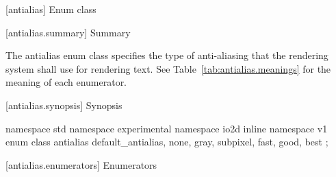  [antialias] {Enum class }

 [antialias.summary] { Summary}

\pnum
The antialias enum class specifies the type of anti-aliasing that the rendering
system shall use for rendering text. See 
Table~\ref{tab:antialias.meanings} for the meaning of each
 enumerator.

 [antialias.synopsis] { Synopsis}

\begin{codeblock}
namespace std { namespace experimental { namespace io2d { inline namespace v1 {
  enum class antialias {
    default_antialias,
    none,
    gray,
    subpixel,
    fast,
    good,
    best
  };
} } } }
\end{codeblock}

 [antialias.enumerators] { Enumerators}

